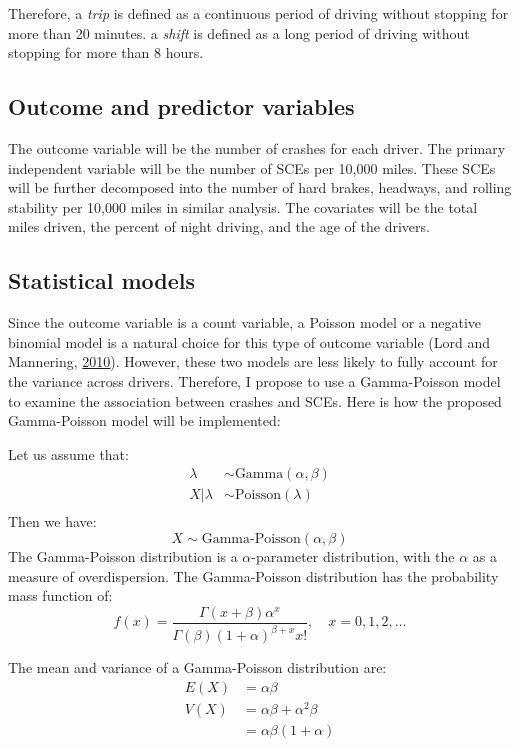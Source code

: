 \documentclass[12pt]{book}
\numberwithin{equation}{chapter}
\begin{document}
Therefore, a \emph{trip} is defined as a continuous period of driving without stopping for more than 20 minutes. a \emph{shift} is defined as a long period of driving without stopping for more than 8 hours.

\hypertarget{outcome-and-predictor-variables}{%
\subsection{Outcome and predictor variables}\label{outcome-and-predictor-variables}}

The outcome variable will be the number of crashes for each driver. The primary independent variable will be the number of SCEs per 10,000 miles. These SCEs will be further decomposed into the number of hard brakes, headways, and rolling stability per 10,000 miles in similar analysis. The covariates will be the total miles driven, the percent of night driving, and the age of the drivers.

\hypertarget{statistical-models}{%
\subsection{Statistical models}\label{statistical-models}}

Since the outcome variable is a count variable, a Poisson model or a negative binomial model is a natural choice for this type of outcome variable (Lord and Mannering, \protect\hyperlink{ref-lord2010statistical}{2010}). However, these two models are less likely to fully account for the variance across drivers. Therefore, I propose to use a Gamma-Poisson model to examine the association between crashes and SCEs. Here is how the proposed Gamma-Poisson model will be implemented:

Let us assume that:
\[
\begin{aligned}
\lambda & \sim \text{Gamma}(\alpha, \beta)\\
X|\lambda & \sim \text{Poisson}(\lambda)\\
\end{aligned}
\]
Then we have:
\[X \sim \text{Gamma-Poisson}(\alpha, \beta)\]
The Gamma-Poisson distribution is a \(\alpha\)-parameter distribution, with the \(\alpha\) as a measure of overdispersion. The Gamma-Poisson distribution has the probability mass function of:
\[f(x) = \frac{\Gamma(x + \beta)\alpha^x}{\Gamma(\beta)(1 + \alpha)^{\beta + x}x!}, \quad x = 0, 1, 2, \dots\]

The mean and variance of a Gamma-Poisson distribution are:
\[
\begin{aligned}
E(X) & = \alpha\beta \\
V(X) & = \alpha\beta + \alpha^2\beta\\
     & = \alpha\beta(1 + \alpha)
\end{aligned}
\]
\end{document}

